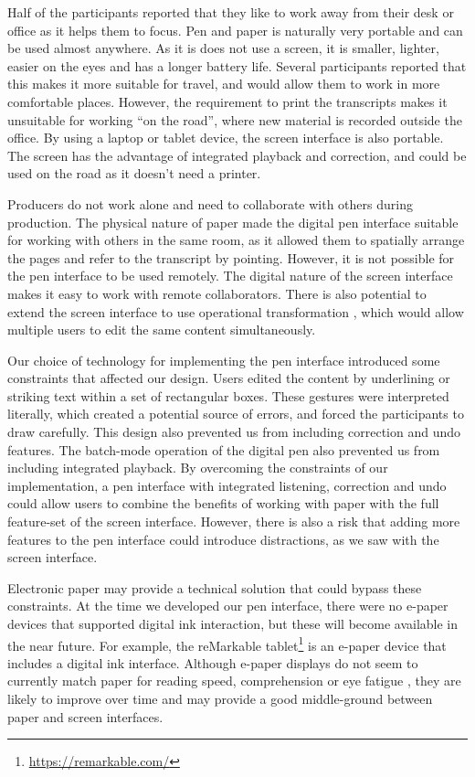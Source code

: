 Half of the participants reported that they like to work away from their desk or office as it helps them to focus. Pen
and paper is naturally very portable and can be used almost anywhere. As it is does not use a screen, it is smaller,
lighter, easier on the eyes and has a longer battery life. Several participants reported that this makes it more
suitable for travel, and would allow them to work in more comfortable places. However, the requirement to print the
transcripts makes it unsuitable for working ``on the road'', where new material is recorded outside the office. By
using a laptop or tablet device, the screen interface is also portable. The screen has the advantage of
integrated playback and correction, and could be used on the road as it doesn't need a printer.

Producers do not work alone and need to collaborate with others during production. The physical nature of paper made
the digital pen interface suitable for working with others in the same room, as it allowed them to spatially arrange
the pages and refer to the transcript by pointing. However, it is not possible for the pen interface to be used
remotely. The digital nature of the screen interface makes it easy to work with remote collaborators. There is also
potential to extend the screen interface to use operational transformation \citep{Sun2004}, which would allow multiple
users to edit the same content simultaneously.

Our choice of technology for implementing the pen interface introduced some constraints that affected our design.
Users edited the content by underlining or striking text within a set of rectangular boxes. These gestures were
interpreted literally, which created a potential source of errors, and forced the participants to draw carefully. This
design also prevented us from including correction and undo features. The batch-mode operation of the digital pen also
prevented us from including integrated playback.  By overcoming the constraints of our implementation, a pen interface
with integrated listening, correction and undo could allow users to combine the benefits of working with paper with the
full feature-set of the screen interface. However, there is also a risk that adding more features to the pen
interface could introduce distractions, as we saw with the screen interface.

Electronic paper may provide a technical solution that could bypass these constraints. At the time we developed our pen
interface, there were no e-paper devices that supported digital ink interaction, but these will become available in the
near future.  For example, the reMarkable tablet\footnote{\url{https://remarkable.com/}} is an e-paper device that
includes a digital ink interface. Although e-paper displays do not seem to currently match paper for reading speed,
comprehension or eye fatigue \citep{Jeong2012, Daniel2013}, they are likely to improve over time and may provide a good
middle-ground between paper and screen interfaces. 


